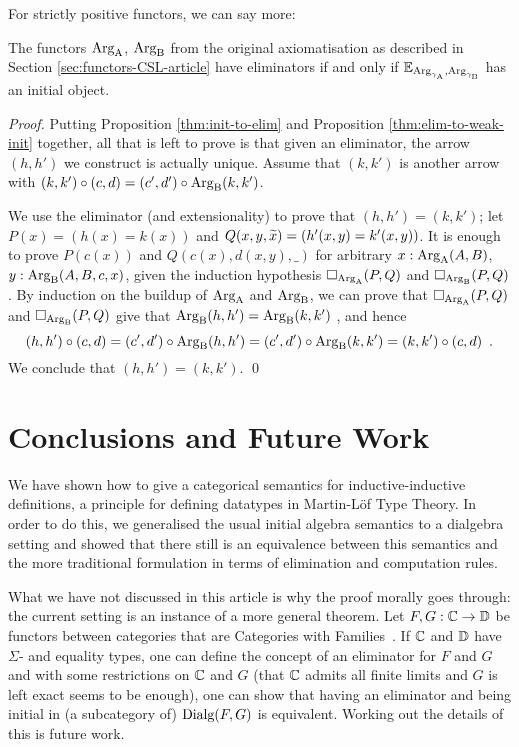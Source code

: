 \documentclass[orivec,envcountsame, ,envcountsect]{llncs}
\begin{document}
For strictly positive functors, we can say more:

\label{sec:elim-init-equiv-CSL}
\begin{theorem}
\label{thm:equiv-init-elim}
The functors $\text{Arg}_{\text{A}}$, $\text{Arg}_{\text{B}}$ from the original axiomatisation as
described in Section \ref{sec:functors-CSL-article} have eliminators
if and only if $\mathbb{E}_{\text{Arg}_{\gamma_\text{A}}, \text{Arg}_{\gamma_\text{B}}}$ has an initial object.
\end{theorem}
\begin{proof}
Putting Proposition
  \ref{thm:init-to-elim} and Proposition \ref{thm:elim-to-weak-init}
  together, all that is left to prove is that given an eliminator, the
  arrow $(h, h')$ we construct is actually unique. Assume that $(k,
  k')$ is another arrow with $(k, k') \circ (c, d) = (c', d') \circ
  \text{Arg}_{\text{B}}(k, k')$.

  We use the eliminator (and extensionality) to prove that $(h, h') =
  (k ,k')$; let $P(x) = (h(x) = k(x))$ and $Q(x, y, \widetilde{x})
  = (h'(x, y) = k'(x, y))$. It is enough to prove $P(c(x))$ and
  $Q(c(x), d(x, y), \_)$ for arbitrary $x : \text{Arg}_{\text{A}}(A, B)$, $y :
  \text{Arg}_{\text{B}}(A, B, c, x)$, given the induction hypothesis $\Box_{\text{Arg}_{\text{A}}}(P,
  Q)$ and $\Box_{\text{Arg}_{\text{B}}}(P, Q)$.
By induction on the buildup of $\text{Arg}_{\text{A}}$ and $\text{Arg}_{\text{B}}$, we can prove that 
$\Box_{\text{Arg}_{\text{A}}}(P,  Q)$ and $\Box_{\text{Arg}_{\text{B}}}(P, Q)$ give that
$\text{Arg}_{\text{B}}(h, h') =  \text{Arg}_{\text{B}}(k, k')$ , and hence
  \[
  (h, h') \circ (c, d) = (c', d') \circ \text{Arg}_{\text{B}}(h, h')
                       = (c', d') \circ \text{Arg}_{\text{B}}(k, k')
                       = (k, k') \circ (c, d) \enspace .
  \]
  We conclude that $(h, h') =  (k ,k')$. \qed
\end{proof}
\section{Conclusions and Future Work}

We have shown how to give a categorical semantics for
inductive-inductive definitions, a principle for defining datatypes in
Martin-L\"of Type Theory. In order to do this, we generalised the
usual initial algebra semantics to a dialgebra setting and showed that
there still is an equivalence between this semantics and the more
traditional formulation in terms of elimination and computation rules.

What we have not discussed in this article is why the proof morally
goes through: the current setting is an instance of a more general
theorem. Let $F, G: \mathbb{C} \to \mathbb{D}$ be functors between categories that are
Categories with Families~\cite{dybjer1996internalTT,hofmann1997syntaxsemantics}.
If $\mathbb{C}$ and $\mathbb{D}$ have $\Sigma$- and equality types, one can define the
concept of an eliminator for $F$ and $G$ and with some restrictions on
$\mathbb{C}$ and $G$ (that $\mathbb{C}$ admits all finite limits and $G$ is left exact
seems to be enough), one can show that having an eliminator and being
initial in (a subcategory of) $\text{Dialg}(F, G)$ is equivalent. Working
out the details of this is future work.
\end{document}
